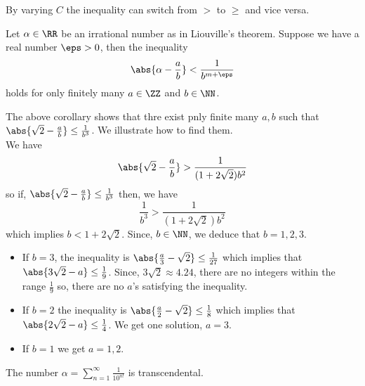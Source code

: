 \documentclass[12pt, a4paper]{article}
\begin{document}
\begin{mdnote}
    By varying \(C\) the inequality can switch from \(>\) to \(\geq\) and vice versa.
\end{mdnote}

\begin{mdcor}
    Let \(\alpha \in \RR\) be an irrational number as in Liouville's theorem. Suppose we have a real number \(\eps>0\), then the inequality
    \[\abs{\alpha-\frac{a}{b}} < \frac{1}{b^{m+\eps}}\]
    holds for only finitely many \(a \in \ZZ\) and \(b \in \NN\).
\end{mdcor}

\begin{mdexample}
    The above corollary  shows that thre exist pnly finite many \(a,b\) such that \(\abs{\sqrt{2}-\frac{a}{b}} \leq \frac{1}{b^3}\). We illustrate how to find them. \\
    We have 
    \[\abs{\sqrt{2}-\frac{a}{b}} > \frac{1}{(1+2\sqrt{2})b^2}\]
    so if, \(\abs{\sqrt{2}-\frac{a}{b}} \leq \frac{1}{b^3}\) then, we have 
    \[\frac{1}{b^3} > \frac{1}{(1+2\sqrt{2})b^2}\]
    which implies \(b<1+2\sqrt{2}\). Since, \(b \in \NN\), we deduce that \(b=1,2,3\).
    \begin{itemize}
        \item If \(b=3\), the inequality is \(\abs{\frac{a}{3}-\sqrt{2}} \leq \frac{1}{27}\) which implies that \(\abs{3\sqrt{2}-a} \leq \frac{1}{9}\). Since, \(3\sqrt{2} \approx 4.24\), there are no integers within the range \(\frac{1}{9}\) so, there are no \(a\)'s satisfying the inequality.
        \item If \(b=2\) the inequality is \(\abs{\frac{a}{2}-\sqrt{2}}\leq \frac{1}{8}\) which implies that \(\abs{2\sqrt{2}-a}\leq \frac{1}{4}\). We get one solution, \(a=3\).
        \item If \(b=1\) we get \(a=1,2\).
    \end{itemize}
\end{mdexample}

\begin{mdprop}
    The number \(\alpha=\sum_{n=1}^{\infty} \frac{1}{10^{n!}}\) is transcendental.
\end{mdprop}
\end{document}
